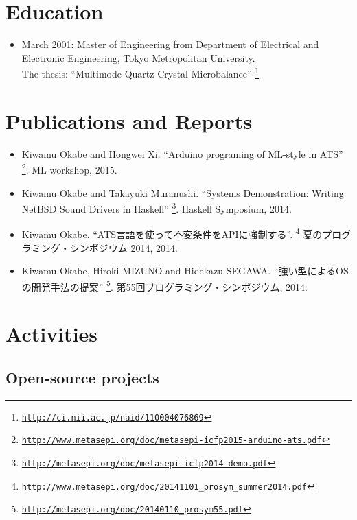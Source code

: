 \documentclass[letterpaper]{article}
\begin{document}
\section*{Education}

\begin{itemize}
  \item March 2001: Master of Engineering from Department of Electrical and Electronic Engineering, Tokyo Metropolitan University. \\
    The thesis: ``Multimode Quartz Crystal Microbalance''
    \footnote{\href{http://ci.nii.ac.jp/naid/110004076869}{\tt http://ci.nii.ac.jp/naid/110004076869}}
\end{itemize}

\section*{Publications and Reports}

\begin{itemize}
  \item Kiwamu Okabe and Hongwei Xi. ``Arduino programing of ML-style in ATS'' \footnote{\href{http://www.metasepi.org/doc/metasepi-icfp2015-arduino-ats.pdf}{\tt http://www.metasepi.org/doc/metasepi-icfp2015-arduino-ats.pdf}}. ML workshop, 2015.
  \item Kiwamu Okabe and Takayuki Muranushi. ``Systems Demonstration: Writing NetBSD Sound Drivers in Haskell'' \footnote{\href{http://metasepi.org/doc/metasepi-icfp2014-demo.pdf}{\tt http://metasepi.org/doc/metasepi-icfp2014-demo.pdf}}. Haskell Symposium, 2014.
  \item Kiwamu Okabe. ``ATS言語を使って不変条件をAPIに強制する''. \footnote{\href{http://www.metasepi.org/doc/20141101\_prosym\_summer2014.pdf}{\tt http://www.metasepi.org/doc/20141101\_prosym\_summer2014.pdf}} 夏のプログラミング・シンポジウム 2014, 2014.
  \item Kiwamu Okabe, Hiroki MIZUNO and Hidekazu SEGAWA. ``強い型によるOSの開発手法の提案'' \footnote{\href{http://metasepi.org/doc/20140110\_prosym55.pdf}{\tt http://metasepi.org/doc/20140110\_prosym55.pdf}}. 第55回プログラミング・シンポジウム, 2014.
\end{itemize}

\section*{Activities}

\subsection*{Open-source projects}
\end{document}
